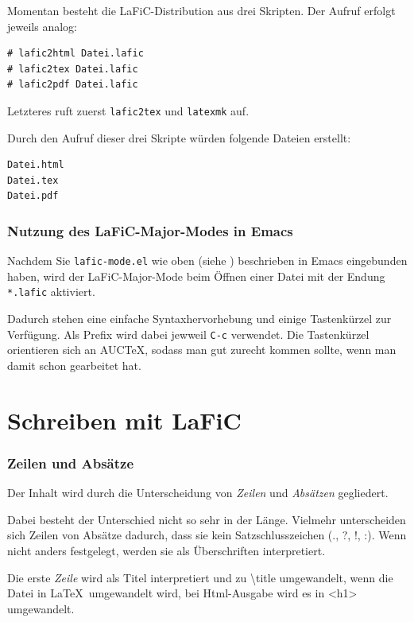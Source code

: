 \documentclass{scrartcl}
\begin{document}
Momentan besteht die LaFiC-Distribution aus drei
Skripten. Der Aufruf erfolgt jeweils analog:

\begin{verbatim}
# lafic2html Datei.lafic
# lafic2tex Datei.lafic
# lafic2pdf Datei.lafic

\end{verbatim}

Letzteres ruft zuerst \texttt{lafic2tex} und \texttt{latexmk} auf.

Durch den Aufruf dieser drei Skripte würden folgende Dateien
erstellt:

\begin{verbatim}
Datei.html
Datei.tex
Datei.pdf

\end{verbatim}

\section{Nutzung des LaFiC-Major-Modes in Emacs}

Nachdem Sie \texttt{lafic-mode.el} wie oben (siehe \xspace )
beschrieben in Emacs eingebunden haben, wird der
LaFiC-Major-Mode beim Öffnen einer Datei mit der Endung
\texttt{*.lafic} aktiviert.

Dadurch stehen eine einfache Syntaxhervorhebung und einige
Tastenkürzel zur Verfügung. Als Prefix wird dabei jewweil
\texttt{C-c} verwendet. Die Tastenkürzel orientieren sich an AUCTeX,
sodass man gut zurecht kommen sollte, wenn man damit schon
gearbeitet hat.

\part{Schreiben mit LaFiC}

\section{Zeilen und Absätze}

Der Inhalt wird durch die Unterscheidung von \emph{Zeilen} und
\emph{Absätzen} gegliedert.

Dabei besteht der Unterschied nicht so sehr in der
Länge. Vielmehr unterscheiden sich Zeilen von Absätze
dadurch, dass sie kein Satzschlusszeichen (., ?, !, :).
Wenn nicht anders festgelegt, werden sie als Überschriften
interpretiert.

Die erste \emph{Zeile} wird als Titel interpretiert und zu \textbackslash title
umgewandelt, wenn die Datei in \LaTeX\  umgewandelt wird, bei
Html-Ausgabe wird es in <h1> umgewandelt.
\end{document}
